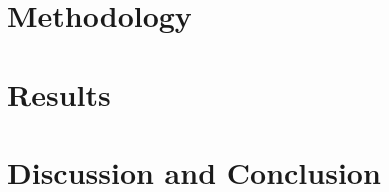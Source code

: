 \documentclass[12pt,a4paper]{article}
\begin{document}
\section{Methodology}
\label{sec:methodology}


\section{Results}
\label{sec:results}


\section{Discussion and Conclusion}
\label{sec:discussion}

\end{document}
